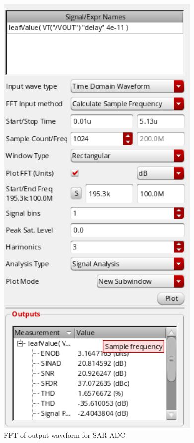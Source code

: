 \documentclass[a4paper,12pt]{article}
\begin{document}
\begin{itemize}
    \begin{figure}[H]
        \centering
        \includegraphics[max width = \textwidth]{3_ENOB_SNR.png}
        \caption{FFT of output waveform for SAR ADC}
        \label{fig:enter-label}
    \end{figure}
\end{itemize}
\end{document}
